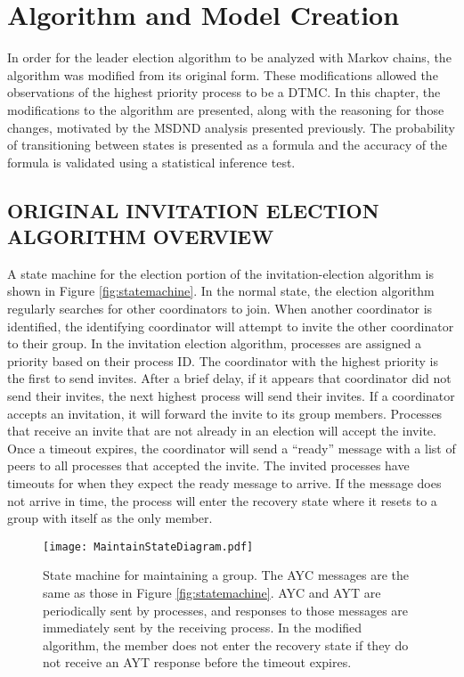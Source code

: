 \chapter{Algorithm and Model Creation}

In order for the leader election algorithm to be analyzed with Markov chains, the algorithm was modified from its original form.
These modifications allowed the observations of the highest priority process to be a \ac{DTMC}.
In this chapter, the modifications to the algorithm are presented, along with the reasoning for those changes, motivated by the MSDND analysis presented previously.
The probability of transitioning between states is presented as a formula and the accuracy of the formula is validated using a statistical inference test.

\section{ORIGINAL INVITATION ELECTION ALGORITHM OVERVIEW}

A state machine for the election portion of the invitation-election algorithm is shown in Figure \ref{fig:statemachine}.
In the normal state, the election algorithm regularly searches for other coordinators to join.
When another coordinator is identified, the identifying coordinator will attempt to invite the other coordinator to their group.
In the invitation election algorithm, processes are assigned a priority based on their process ID.
The coordinator with the highest priority is the first to send invites.
After a brief delay, if it appears that coordinator did not send their invites, the next highest process will send their invites.
If a coordinator accepts an invitation, it will forward the invite to its group members.
Processes that receive an invite that are not already in an election will accept the invite.
Once a timeout expires, the coordinator will send a ``ready'' message with a list of peers to all processes that accepted the invite.
The invited processes have timeouts for when they expect the ready message to arrive.
If the message does not arrive in time, the process will enter the recovery state where it resets to a group with itself as the only member.

\begin{figure*}[!t]
\texttt{[image: MaintainStateDiagram.pdf]}
\caption[State machine for maintaining a group]{State machine for maintaining a group. The \ac{AYC} messages are the same as those in Figure \ref{fig:statemachine}. \ac{AYC} and \ac{AYT} are periodically sent by processes, and responses to those messages are immediately sent by the receiving process. In the modified algorithm, the member does not enter the recovery state if they do not receive an AYT response before the timeout expires.}
\label{fig:statemachine2}
\end{figure*}

